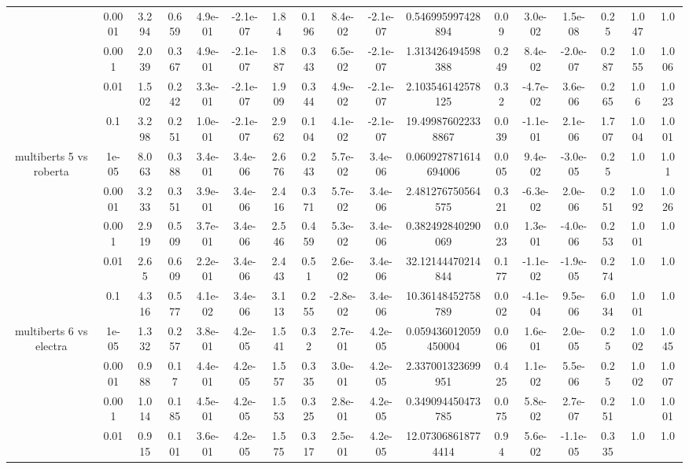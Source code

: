 \begin{tabular}{|c|c|c|c|c|c|c|c|c|c|c|c|c|c|c|c|c|}
 & 0.0001 & 3.294 & 0.659 & 4.9e-01 & -2.1e-07 & 1.84 & 0.196 & 8.4e-02 & -2.1e-07 & 0.546995997428894 & 0.09 & 3.0e-02 & 1.5e-08 & 0.25 & 1.047 & 1.0 \\
 & 0.001 & 2.039 & 0.367 & 4.9e-01 & -2.1e-07 & 1.887 & 0.343 & 6.5e-02 & -2.1e-07 & 1.313426494598388 & 0.249 & 8.4e-02 & -2.0e-07 & 0.287 & 1.055 & 1.006 \\
 & 0.01 & 1.502 & 0.242 & 3.3e-01 & -2.1e-07 & 1.909 & 0.344 & 4.9e-02 & -2.1e-07 & 2.103546142578125 & 0.32 & -4.7e-02 & 3.6e-06 & 0.265 & 1.06 & 1.023 \\
 & 0.1 & 3.298 & 0.251 & 1.0e-01 & -2.1e-07 & 2.962 & 0.104 & 4.1e-02 & -2.1e-07 & 19.499876022338867 & 0.039 & -1.1e-01 & 2.1e-06 & 1.707 & 1.004 & 1.001 \\
\hline
\multirow{5}{*}{multiberts 5 vs roberta } & 1e-05 & 8.063 & 0.388 & 3.4e-01 & 3.4e-06 & 2.676 & 0.243 & 5.7e-02 & 3.4e-06 & 0.060927871614694006 & 0.005 & 9.4e-02 & -3.0e-05 & 0.25 & 1.0 & 1.01 \\
 & 0.0001 & 3.233 & 0.351 & 3.9e-01 & 3.4e-06 & 2.416 & 0.371 & 5.7e-02 & 3.4e-06 & 2.481276750564575 & 0.321 & -6.3e-02 & 2.0e-06 & 0.251 & 1.092 & 1.026 \\
 & 0.001 & 2.919 & 0.509 & 3.7e-01 & 3.4e-06 & 2.546 & 0.459 & 5.3e-02 & 3.4e-06 & 0.382492840290069 & 0.023 & 1.3e-01 & -4.0e-06 & 0.253 & 1.001 & 1.0 \\
 & 0.01 & 2.65 & 0.609 & 2.2e-01 & 3.4e-06 & 2.443 & 0.51 & 2.6e-02 & 3.4e-06 & 32.12144470214844 & 0.177 & -1.1e-02 & -1.9e-05 & 0.274 & 1.0 & 1.0 \\
 & 0.1 & 4.316 & 0.577 & 4.1e-02 & 3.4e-06 & 3.113 & 0.255 & -2.8e-02 & 3.4e-06 & 10.36148452758789 & 0.002 & -4.1e-04 & 9.5e-06 & 6.034 & 1.001 & 1.0 \\
\hline
\multirow{5}{*}{multiberts 6 vs electra } & 1e-05 & 1.332 & 0.257 & 3.8e-01 & 4.2e-05 & 1.541 & 0.32 & 2.7e-01 & 4.2e-05 & 0.059436012059450004 & 0.006 & 1.6e-01 & 2.0e-05 & 0.25 & 1.002 & 1.045 \\
 & 0.0001 & 0.988 & 0.17 & 4.4e-01 & 4.2e-05 & 1.557 & 0.335 & 3.0e-01 & 4.2e-05 & 2.337001323699951 & 0.425 & 1.1e-02 & 5.5e-06 & 0.25 & 1.002 & 1.007 \\
 & 0.001 & 1.014 & 0.185 & 4.5e-01 & 4.2e-05 & 1.553 & 0.325 & 2.8e-01 & 4.2e-05 & 0.349094450473785 & 0.075 & 5.8e-02 & 2.7e-07 & 0.251 & 1.0 & 1.001 \\
 & 0.01 & 0.915 & 0.101 & 3.6e-01 & 4.2e-05 & 1.575 & 0.317 & 2.5e-01 & 4.2e-05 & 12.073068618774414 & 0.94 & 5.6e-02 & -1.1e-05 & 0.335 & 1.0 & 1.0 \\

\end{tabular}

